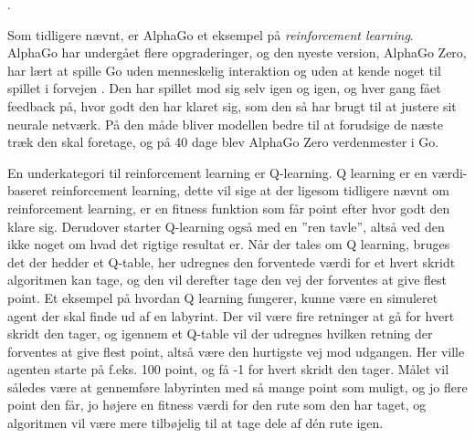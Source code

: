 \cite{deep-reinforcement-learning}. 
\par
Som tidligere nævnt, er AlphaGo et eksempel på \textit{reinforcement learning}. AlphaGo har undergået flere opgraderinger, og den nyeste version, AlphaGo Zero, har lært at spille Go uden menneskelig interaktion og uden at kende noget til spillet i forvejen \cite{alphago}. Den har spillet mod sig selv igen og igen, og hver gang fået feedback på, hvor godt den har klaret sig, som den så har brugt til at justere sit neurale netværk. På den måde bliver modellen bedre til at forudsige de næste træk den skal foretage, og på 40 dage blev AlphaGo Zero verdenmester i Go.
\par
En underkategori til reinforcement learning er Q-learning. Q learning er en værdi-baseret reinforcement learning, dette vil sige at der ligesom tidligere nævnt om reinforcement learning, er en fitness funktion som får point efter hvor godt den klare sig. Derudover starter Q-learning også med en ”ren  tavle”, altså ved den ikke noget om hvad det rigtige resultat er. Når der tales om Q learning, bruges det der hedder et Q-table, her udregnes den forventede værdi for et hvert skridt algoritmen kan tage, og den vil derefter tage den vej der forventes at give flest point\cite{Watkins1992}.
Et eksempel på hvordan Q learning fungerer, kunne være en simuleret agent der skal finde ud af en labyrint. Der vil være fire retninger at gå for hvert skridt den tager, og igennem et Q-table vil der udregnes hvilken retning der forventes at give flest point, altså være den hurtigste vej mod udgangen.  Her ville agenten starte på f.eks. 100 point, og få -1 for hvert skridt den tager. Målet vil således være at gennemføre labyrinten med så mange point som muligt, og jo flere point den får, jo højere en fitness værdi for den rute som den har taget, og algoritmen vil være mere tilbøjelig til at tage dele af dén rute igen\cite{ThomasSimonini2018}. 